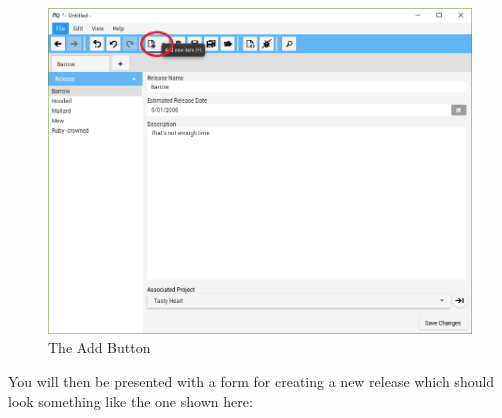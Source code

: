 \begin{figure}[H]
\centering
\includegraphics[width=\textwidth]{images/screenshots/releases2.PNG}
\caption{The Add Button}
\label{fig:new_project}
\end{figure}

You will then be presented with a form for creating a new release which should look something like the one shown here:


